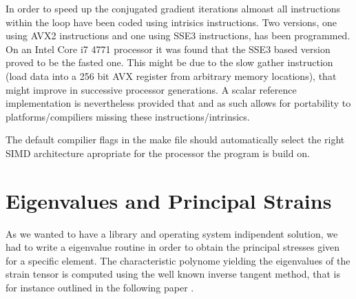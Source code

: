 In order to speed up the conjugated gradient iterations almoast all
instructions within the loop have been coded using intrisics instructions.
Two versions, one using AVX2 instructions and one using SSE3 instructions,
has been programmed. On an Intel Core i7 4771 processor it was found
that the SSE3 based version proved to be the fasted one. This might be
due to the slow gather instruction (load data into a 256 bit AVX register from
arbitrary memory locations), that might improve in successive
processor generations. A scalar reference implementation is
nevertheless provided that and as such allows for portability to
platforms/compiliers missing these instructions/intrinsics.

The default compilier flags in the make file should automatically
select the right SIMD architecture apropriate for the processor the
program is build on. 

\section{Eigenvalues and Principal Strains}

As we wanted to have a library and operating system indipendent
solution, we had to write a eigenvalue routine in order to obtain the
principal stresses given for a specific element. The characteristic
polynome yielding the eigenvalues of the strain tensor is computed
using the well known inverse tangent method, that is for instance
outlined in the following paper \cite{eigval}. 

